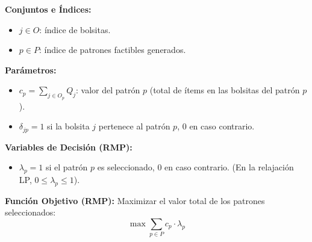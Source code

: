 \documentclass[a4paper,12pt]{article}
\begin{document}
\textbf{Conjuntos e Índices:}
\begin{itemize}    \item $j \in O$: índice de bolsitas.
    \item $p \in P$: índice de patrones factibles generados.
\end{itemize}

\textbf{Parámetros:}
\begin{itemize}    \item $c_p = \sum_{j \in O_p} Q_j$: valor del patrón $p$ (total de ítems en las bolsitas del patrón $p$).
    \item $\delta_{jp} = 1$ si la bolsita $j$ pertenece al patrón $p$, $0$ en caso contrario.
\end{itemize}

\textbf{Variables de Decisión (RMP):}
\begin{itemize}
    \item $\lambda_p = 1$ si el patrón $p$ es seleccionado, $0$ en caso contrario. (En la relajación LP, $0 \le \lambda_p \le 1$).
\end{itemize}

\textbf{Función Objetivo (RMP):}
Maximizar el valor total de los patrones seleccionados:
\[ \max \sum_{p \in P} c_p \cdot \lambda_p \]
\end{document}
